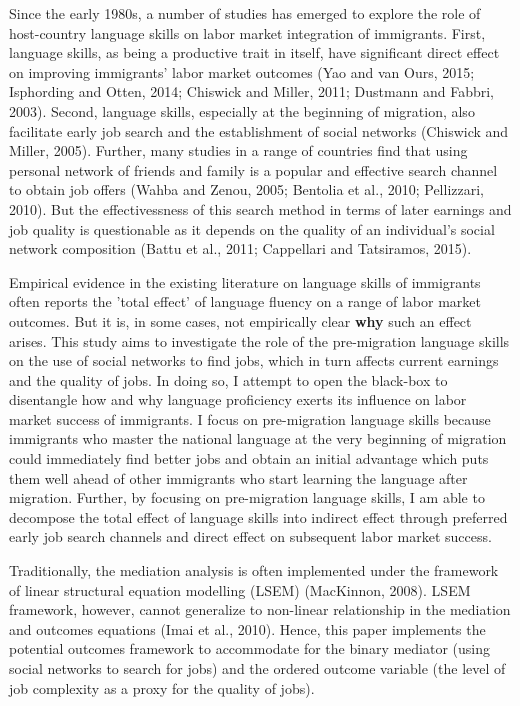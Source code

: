 \documentclass[12pt,a4paper]{article}
\begin{document}
Since the early 1980s, a number of studies has emerged to explore the role of host-country language skills on labor market integration of immigrants. First, language skills, as being a productive trait in itself, have significant direct effect on improving immigrants' labor market outcomes (Yao and van Ours, 2015; Isphording and Otten, 2014; Chiswick and Miller, 2011; Dustmann and Fabbri, 2003). Second, language skills, especially at the beginning of migration, also facilitate early job search and the establishment of social networks (Chiswick and Miller, 2005). Further, many studies in a range of countries find that using personal network of friends and family is a popular and effective search channel to obtain job offers (Wahba and Zenou, 2005; Bentolia et al., 2010; Pellizzari, 2010). But the effectivessness of this search method in terms of later earnings and job quality is questionable as it depends on the quality of an individual's social network composition (Battu et al., 2011; Cappellari and Tatsiramos, 2015).

Empirical evidence in the existing literature on language skills of immigrants often reports the 'total effect' of language fluency on a range of labor market outcomes. But it is, in some cases, not empirically clear \textbf{why} such an effect arises. This study aims to investigate the role of the pre-migration language skills on the use of social networks to find jobs, which in turn affects current earnings and the quality of jobs. In doing so, I attempt to open the black-box to disentangle how and why language proficiency exerts its influence on labor market success of immigrants. I focus on pre-migration language skills because immigrants who master the national language at the very beginning of migration could immediately find better jobs and obtain an initial advantage which puts them well ahead of other immigrants who start learning the language after migration. Further, by focusing on pre-migration language skills, I am able to decompose the total effect of language skills into indirect effect through preferred early job search channels and direct effect on subsequent labor market success.

Traditionally, the mediation analysis is often implemented under the framework of linear structural equation modelling (LSEM) (MacKinnon, 2008). LSEM framework, however, cannot generalize to non-linear relationship in the mediation and outcomes equations (Imai et al., 2010). Hence, this paper implements the potential outcomes framework to accommodate for the binary mediator (using social networks to search for jobs) and the ordered outcome variable (the level of job complexity as a proxy for the quality of jobs).
\end{document}
